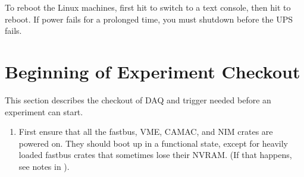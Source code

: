 {{\par
To reboot the Linux machines, first hit 
to switch to a text console, then hit 
to reboot.
If power fails for a prolonged time,
you must shutdown before the UPS fails.





\section{Beginning of Experiment Checkout}

\par
This section describes the
checkout of DAQ and trigger
needed before an experiment can start.

\begin{enumerate}
\item{First ensure that all the fastbus, VME,
CAMAC, and NIM crates are powered
on. They should
boot up in a functional state, except for
heavily loaded fastbus crates that sometimes
lose their NVRAM.  (If that happens, see notes
in ).}



\end{enumerate}}}
